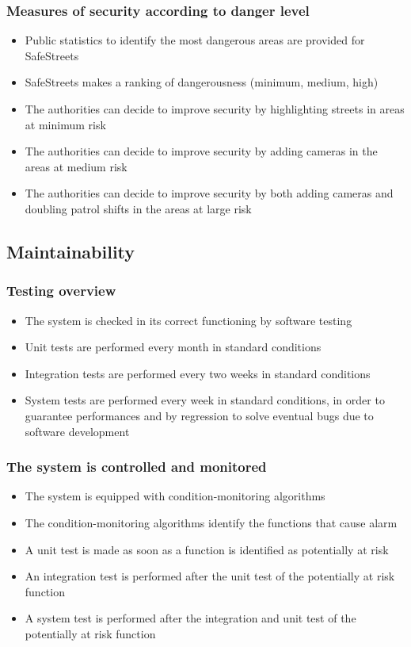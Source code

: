\subsubsection{Measures of security according to danger level}
\begin{itemize}
  \item Public statistics to identify the most dangerous areas are provided for SafeStreets
  \item SafeStreets makes a ranking of dangerousness (minimum, medium, high)
  \item The authorities can decide to improve security by highlighting streets in areas at minimum risk
  \item The authorities can decide to improve security by adding cameras in the areas at medium risk 
  \item The authorities can decide to improve security by both adding cameras and doubling patrol shifts  in the areas at large risk
\end{itemize}

\subsection{Maintainability}
\subsubsection{Testing overview}
\begin{itemize}
  \item The system is checked in its correct functioning by software testing
  \item Unit tests are performed every month in standard conditions
  \item Integration tests are performed every two weeks in standard conditions
  \item System tests are performed every week in standard conditions, in order to guarantee performances and by regression to solve eventual bugs due to software development
\end{itemize}

\subsubsection{The system is controlled and monitored}
\begin{itemize}
  \item The system is equipped with condition-monitoring algorithms 
  \item The condition-monitoring algorithms identify the functions that cause alarm
  \item A unit test is made as soon as a function is identified as potentially at risk
  \item An integration test is performed after the unit test of the potentially at risk function
  \item A system test is performed after the integration and unit test of the potentially at risk function
\end{itemize}

